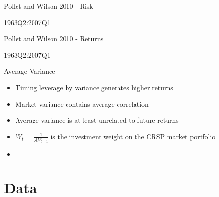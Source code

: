 \documentclass{beamer}
\begin{document}
\begin{frame}{Pollet and Wilson 2010 - Risk}
		\vspace{-12pt}
		\begin{table}
			\caption{1963Q2:2007Q1}
			\vspace{-18pt}
			\begin{adjustbox}{width=\textwidth,height=3cm}
				
			\end{adjustbox}
		\end{table}
\end{frame}

\begin{frame}{Pollet and Wilson 2010 - Returns}
		\vspace{-12pt}
		\begin{table}
			\caption{1963Q2:2007Q1}
			\vspace{-18pt}
			\begin{adjustbox}{width=\textwidth,height=3cm}
				
			\end{adjustbox}
		\end{table}
\end{frame}

\begin{frame}{Average Variance}
	\begin{itemize}[<+->]
		\item Timing leverage by variance generates higher returns
		\item Market variance contains average correlation
		\item Average variance is at least unrelated to future returns
		\item $W_{t}$ = $\frac{1}{AV_{t-1}}$ is the investment weight on the CRSP market portfolio
		\item 	\begin{adjustbox}{width=\textwidth}
			
		\end{adjustbox}
	\end{itemize}

\end{frame}

\section{Data}
\end{document}
